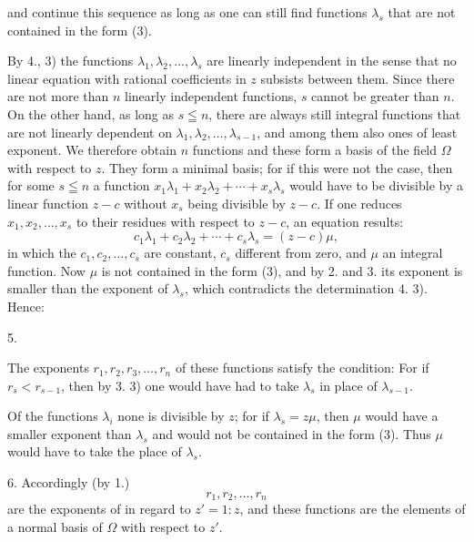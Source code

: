 and continue this sequence as long as one can still find functions $\lambda_s$ that are not contained in the form (3).

By 4., 3) the functions $\lambda_1, \lambda_2, \ldots, \lambda_s$ are linearly independent in the sense that no linear equation with rational coefficients in $z$ subsists between them. Since there are not more than $n$ linearly independent functions, $s$ cannot be greater than $n$. On the other hand, as long as $s \leqq n$, there are always still integral functions that are not linearly dependent on $\lambda_1, \lambda_2, \ldots, \lambda_{s-1}$, and among them also ones of least exponent. We therefore obtain $n$ functions
and these form a basis of the field $\Omega$ with respect to $z$. They form a minimal basis; for if this were not the case, then for some $s \leqq n$ a function $x_1\lambda_1 + x_2\lambda_2 + \cdots + x_s\lambda_s$ would have to be divisible by a linear function $z - c$ without $x_s$ being divisible by $z - c$. If one reduces $x_1, x_2, \ldots, x_s$ to their residues with respect to $z - c$, an equation results:
\[
c_1\lambda_1 + c_2\lambda_2 + \cdots + c_s\lambda_s = (z - c)\mu,
\]
in which the $c_1, c_2, \ldots, c_s$ are constant, $c_s$ different from zero, and $\mu$ an integral function. Now $\mu$ is not contained in the form (3), and by 2. and 3. its exponent is smaller than the exponent of $\lambda_s$, which contradicts the determination 4. 3). Hence:

5. 

The exponents $r_1, r_2, r_3, \ldots, r_n$ of these functions satisfy the condition:
For if $r_s < r_{s-1}$, then by 3. 3) one would have had to take $\lambda_s$ in place of $\lambda_{s-1}$.

Of the functions $\lambda_i$ none is divisible by $z$; for if $\lambda_s = z\mu$, then $\mu$ would have a smaller exponent than $\lambda_s$ and would not be contained in the form (3). Thus $\mu$ would have to take the place of $\lambda_s$.

6. Accordingly (by 1.)
\[
r_1, r_2, \ldots, r_n
\]
are the exponents of
in regard to $z' = 1:z$, and these functions are the elements of a normal basis of $\Omega$ with respect to $z'$.
